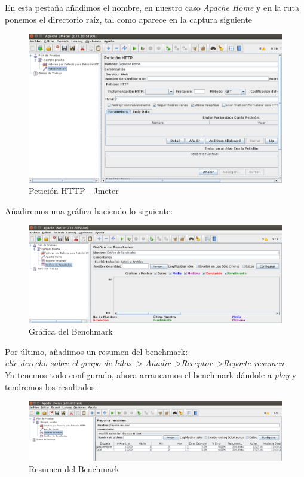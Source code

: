 En esta pestaña añadimos el nombre, en nuestro caso \textit{Apache Home} y en la ruta ponemos el directorio raíz, tal como aparece en la captura siguiente

\begin{figure}[h]
	\centering
	\includegraphics[scale=0.35]{images/jmeter3.png}
	\caption{Petición HTTP - Jmeter}
\end{figure}

Añadiremos una gráfica haciendo lo siguiente: \\
\begin{figure}[h]
	\centering
	\includegraphics[scale=0.338]{images/graf.png}
	\caption{Gráfica del Benchmark}
\end{figure}


\newpage
Por último, añadimos un resumen del benchmark: \\
\textit{clic derecho sobre el grupo de hilos--> Añadir-->Receptor-->Reporte resumen} \\

Ya tenemos todo configurado, ahora arrancamos el benchmark dándole a \textit{play} y tendremos los resultados:

\begin{figure}[h]
	\centering
	\includegraphics[scale=0.35]{images/resumen.png}
	\caption{Resumen del Benchmark}
\end{figure}

